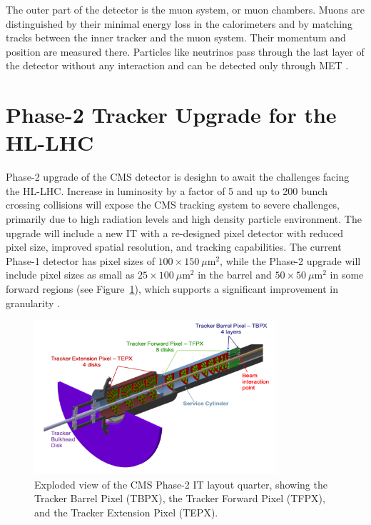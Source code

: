 The outer part of the detector is the muon system, or muon chambers. Muons are distinguished by their minimal energy loss in the calorimeters and by matching tracks between the inner tracker and the muon system. Their momentum and position are measured there. Particles like neutrinos pass through the last layer of the detector without any interaction and can be detected only through MET \cite{The_CMS_Collaboration_2008, Hayrapetyan_2024}.

\section{Phase-2 Tracker Upgrade for the HL-LHC}

Phase-2 upgrade of the CMS detector is desighn to await the challenges facing the HL-LHC. Increase in luminosity by a factor of 5 and up to 200 bunch crossing collisions will expose the CMS tracking system to severe challenges, primarily due to high radiation levels and high density particle environment. The upgrade will include a new IT with a re-designed pixel detector with reduced pixel size, improved spatial resolution, and tracking capabilities. The current Phase-1 detector has pixel sizes of $100 \times 150~\mu\text{m}^2$, while the Phase-2 upgrade will include pixel sizes as small as $25 \times 100~\mu\text{m}^2$ in the barrel and $50 \times 50~\mu\text{m}^2$ in some forward regions (see Figure~\ref{fig:IT}), which supports a significant improvement in granularity \cite{thetrackergroupofthecmscollaboration2023evaluationplanarsiliconpixel, Orfanelli:2780125}.

\begin{figure}[H]
    \centering
    \includegraphics[width=0.8\textwidth]{images/IT.png}
    \caption{Exploded view of the CMS Phase-2 IT layout quarter, showing the Tracker Barrel Pixel (TBPX), the Tracker Forward Pixel (TFPX), and the Tracker Extension Pixel (TEPX).}
    \label{fig:IT}
\end{figure}

